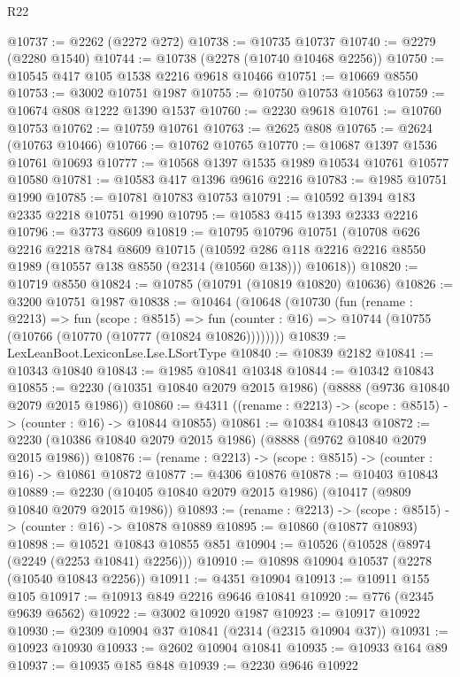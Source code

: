 \begin{lexlean}{R22}
\begin{coremodule}
@10737 := @2262 (@2272 @272)
@10738 := @10735 @10737
@10740 := @2279 (@2280 @1540)
@10744 := @10738 (@2278 (@10740 @10468 @2256))
@10750 := @10545 @417 @105 @1538 @2216 @9618 @10466
@10751 := @10669 @8550
@10753 := @3002 @10751 @1987
@10755 := @10750 @10753 @10563
@10759 := @10674 @808 @1222 @1390 @1537
@10760 := @2230 @9618
@10761 := @10760 @10753
@10762 := @10759 @10761
@10763 := @2625 @808
@10765 := @2624 (@10763 @10466)
@10766 := @10762 @10765
@10770 := @10687 @1397 @1536 @10761 @10693
@10777 := @10568 @1397 @1535 @1989 @10534 @10761 @10577 @10580
@10781 := @10583 @417 @1396 @9616 @2216
@10783 := @1985 @10751 @1990
@10785 := @10781 @10783 @10753
@10791 := @10592 @1394 @183 @2335 @2218 @10751 @1990
@10795 := @10583 @415 @1393 @2333 @2216
@10796 := @3773 @8609
@10819 := @10795
    @10796
    @10751
    (@10708
      @626
      @2216
      @2218
      @784
      @8609
      @10715
      (@10592 @286 @118 @2216 @2216 @8550 @1989 (@10557 @138 @8550 (@2314 (@10560 @138))) @10618))
@10820 := @10719 @8550
@10824 := @10785 (@10791 (@10819 @10820) @10636)
@10826 := @3200 @10751 @1987
@10838 := @10464
    (@10648
      (@10730
        (fun (rename : @2213) =>
        fun (scope : @8515) =>
        fun (counter : @16) => @10744 (@10755 (@10766 (@10770 (@10777 (@10824 @10826))))))))
@10839 := LexLeanBoot.LexiconLse.Lse.LSortType
@10840 := @10839 @2182
@10841 := @10343 @10840
@10843 := @1985 @10841 @10348
@10844 := @10342 @10843
@10855 := @2230 (@10351 @10840 @2079 @2015 @1986) (@8888 (@9736 @10840 @2079 @2015 @1986))
@10860 := @4311 ((rename : @2213) -> (scope : @8515) -> (counter : @16) -> @10844 @10855)
@10861 := @10384 @10843
@10872 := @2230 (@10386 @10840 @2079 @2015 @1986) (@8888 (@9762 @10840 @2079 @2015 @1986))
@10876 := (rename : @2213) -> (scope : @8515) -> (counter : @16) -> @10861 @10872
@10877 := @4306 @10876
@10878 := @10403 @10843
@10889 := @2230 (@10405 @10840 @2079 @2015 @1986) (@10417 (@9809 @10840 @2079 @2015 @1986))
@10893 := (rename : @2213) -> (scope : @8515) -> (counter : @16) -> @10878 @10889
@10895 := @10860 (@10877 @10893)
@10898 := @10521 @10843 @10855 @851
@10904 := @10526 (@10528 (@8974 (@2249 (@2253 @10841) @2256)))
@10910 := @10898 @10904 @10537 (@2278 (@10540 @10843 @2256))
@10911 := @4351 @10904
@10913 := @10911 @155 @105
@10917 := @10913 @849 @2216 @9646 @10841
@10920 := @776 (@2345 @9639 @6562)
@10922 := @3002 @10920 @1987
@10923 := @10917 @10922
@10930 := @2309 @10904 @37 @10841 (@2314 (@2315 @10904 @37))
@10931 := @10923 @10930
@10933 := @2602 @10904 @10841
@10935 := @10933 @164 @89
@10937 := @10935 @185 @848
@10939 := @2230 @9646 @10922

\end{coremodule}
\end{lexlean}
